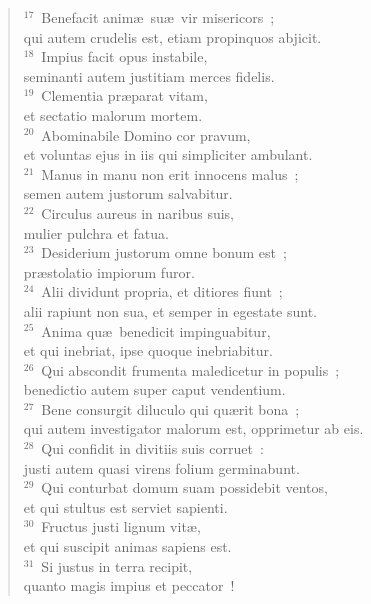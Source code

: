 \begin{flushleft}\begin{verse}${}^{17}$~Benefacit anim\ae\ su\ae\ vir misericors~;\\ qui autem crudelis est, etiam propinquos abjicit.\\
${}^{18}$~Impius facit opus instabile,\\ seminanti autem justitiam merces fidelis.\\
${}^{19}$~Clementia pr\ae parat vitam,\\ et sectatio malorum mortem.\\
${}^{20}$~Abominabile Domino cor pravum,\\ et voluntas ejus in iis qui simpliciter ambulant.\\
${}^{21}$~Manus in manu non erit innocens malus~;\\ semen autem justorum salvabitur.\\
${}^{22}$~Circulus aureus in naribus suis,\\ mulier pulchra et fatua.\\
${}^{23}$~Desiderium justorum omne bonum est~;\\ pr\ae stolatio impiorum furor.\\
${}^{24}$~Alii dividunt propria, et ditiores fiunt~;\\ alii rapiunt non sua, et semper in egestate sunt.\\
${}^{25}$~Anima qu\ae\ benedicit impinguabitur,\\ et qui inebriat, ipse quoque inebriabitur.\\
${}^{26}$~Qui abscondit frumenta maledicetur in populis~;\\ benedictio autem super caput vendentium.\\
${}^{27}$~Bene consurgit diluculo qui qu\ae rit bona~;\\ qui autem investigator malorum est, opprimetur ab eis.\\
${}^{28}$~Qui confidit in divitiis suis corruet~:\\ justi autem quasi virens folium germinabunt.\\
${}^{29}$~Qui conturbat domum suam possidebit ventos,\\ et qui stultus est serviet sapienti.\\
${}^{30}$~Fructus justi lignum vit\ae ,\\ et qui suscipit animas sapiens est.\\
${}^{31}$~Si justus in terra recipit,\\ quanto magis impius et peccator~!\end{verse}\end{flushleft}


